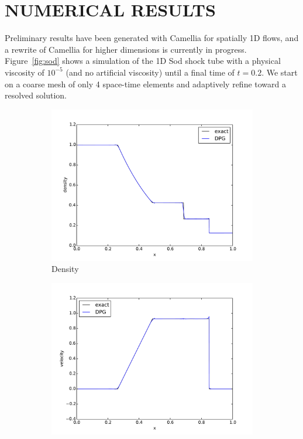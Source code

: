 \documentclass{parcfd2014}
\begin{document}
\section{NUMERICAL RESULTS}
Preliminary results have been generated with Camellia\cite{CamelliaDPG} for spatially 1D flows,
and a rewrite of Camellia for higher dimensions is currently in progress.
Figure~\ref{fig:sod} shows a simulation of the 1D Sod shock tube with a physical viscosity of $10^{-5}$ (and no artificial viscosity) 
until a final time of $t=0.2$.
We start on a coarse mesh of only 4 space-time elements and adaptively refine toward a resolved solution.

\begin{figure}[h]
\centering
\begin{subfigure}[c]{0.3\textwidth}
\centering
\includegraphics[width=\textwidth]{figs/Sod1e-5/den15.pdf}
\caption{Density}
\label{fig:sod_den14}
\end{subfigure}
\begin{subfigure}[c]{0.3\textwidth}
\centering
\includegraphics[width=\textwidth]{figs/Sod1e-5/vel15.pdf}

\end{subfigure}
\end{figure}
\end{document}
